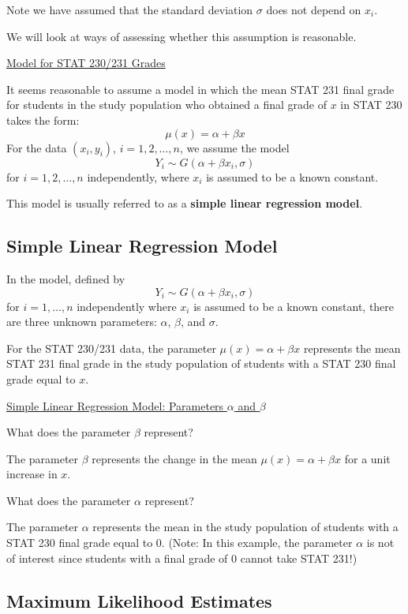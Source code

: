 Note we have assumed that the standard deviation $ \sigma $ does not depend
on $ x_i $.

We will look at ways of assessing whether this assumption is reasonable.

\underline{Model for STAT 230/231 Grades}

It seems reasonable to assume a model in which the mean STAT 231 final grade for
students in the study population who obtained a final grade of $ x $
in STAT 230 takes the form:
\[\mu(x)=\alpha+\beta x\]
For the data $ (x_i,y_i) $, $ i=1,2,\ldots ,n $, we assume the model
\[Y_{i} \sim G\left(\alpha+\beta x_{i}, \sigma\right)\]
for $ i=1,2,\ldots ,n $ independently, where $ x_i $ is assumed to be a known constant.

This model is usually referred to as a \textbf{simple linear regression model}.

\subsection{Simple Linear Regression Model}
In the model, defined by
\[Y_{i} \sim G\left(\alpha+\beta x_{i}, \sigma\right)\]
for $ i=1,\ldots ,n $ independently where $ x_i $ is assumed to be a known constant,
there are three unknown parameters: $ \alpha $, $ \beta $, and $ \sigma $.

For the STAT 230/231 data, the parameter $ \mu(x)=\alpha+\beta x $ represents
the mean STAT 231 final grade in the study population of students with a STAT 230 final
grade equal to $ x $.

\underline{Simple Linear Regression Model: Parameters $ \alpha $ and $ \beta $}

What does the parameter $ \beta $ represent?

The parameter $ \beta $ represents the change in the mean
$ \mu(x)=\alpha+\beta x $ for a unit increase in $ x $.

What does the parameter $ \alpha $ represent?

The parameter $ \alpha $ represents the mean in the study population of students
with a STAT 230 final grade equal to $ 0 $. (Note: In this example, the parameter
$ \alpha $ is not of interest since students with a final grade of $ 0 $ cannot
take STAT 231!)

\subsection{Maximum Likelihood Estimates}


